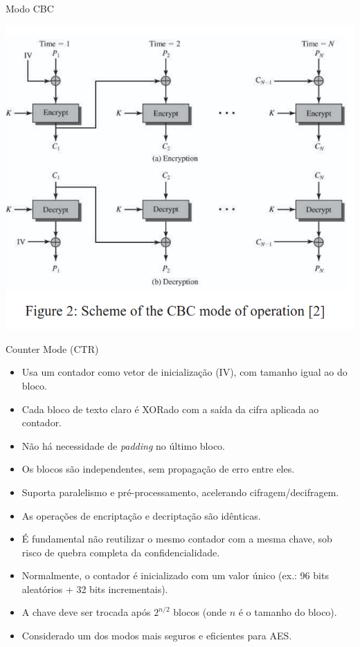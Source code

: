 \begin{frame}{Modo CBC}


    \centering
    \includegraphics[width=0.6\linewidth]{Figuras/aes-modo-cbc.png}

\end{frame}

\begin{frame}{Counter Mode (CTR)}
    \begin{itemize}
        \item Usa um contador como vetor de inicialização (IV), com tamanho igual ao do bloco.
        \item Cada bloco de texto claro é XORado com a saída da cifra aplicada ao contador.
        \item Não há necessidade de \textit{padding} no último bloco.
        \item Os blocos são independentes, sem propagação de erro entre eles.
        \item Suporta paralelismo e pré-processamento, acelerando cifragem/decifragem.
        \item As operações de encriptação e decriptação são idênticas.
        \item É fundamental não reutilizar o mesmo contador com a mesma chave, sob risco de quebra completa da confidencialidade.
        \item Normalmente, o contador é inicializado com um valor único (ex.: 96 bits aleatórios + 32 bits incrementais).
        \item A chave deve ser trocada após $2^{n/2}$ blocos (onde $n$ é o tamanho do bloco).
        \item Considerado um dos modos mais seguros e eficientes para AES.
    \end{itemize}
\end{frame}

